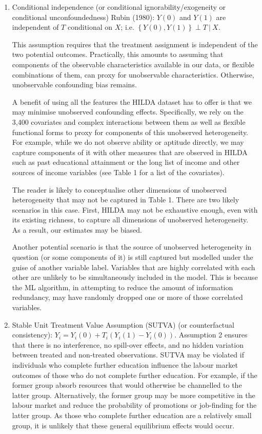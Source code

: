 \documentclass[12pt, a4paper]{article}
\begin{document}
\begin{enumerate}
  \item Conditional independence (or conditional ignorability/exogeneity or conditional unconfoundedness) Rubin (1980): $Y(0)$ and $Y(1)$ are independent of $T$ conditional on $X$; i.e. $\left\{Y(0), Y(1)\right\} \perp T~|~X$.  
  
This assumption requires that the treatment assignment is independent of the two potential outcomes. Practically, this amounts to assuming that components of the observable characteristics available in our data, or flexible combinations of them, can proxy for unobservable characteristics. Otherwise, unobservable confounding bias remains.

    A benefit of using all the features the HILDA dataset has to offer is that we may minimise unobserved confounding effects. Specifically, we rely on the 3,400 covariates and complex interactions between them as well as flexible functional forms to proxy for components of this unobserved heterogeneity. For example, while we do not observe ability or aptitude directly, we may capture components of it with other measures that are observed in HILDA such as past educational attainment or the long list of income and other sources of income variables (see Table 1 for a list of the covariates). 

The reader is likely to conceptualise other dimensions of unobserved heterogeneity that may not be captured in Table 1. There are two likely scenarios in this case. First, HILDA may not be exhaustive enough, even with its existing richness, to capture all dimensions of unobserved heterogeneity. As a result, our estimates may be biased. 

Another potential scenario is that the source of unobserved heterogeneity in question (or some components of it) is still captured but modelled under the guise of another variable label. Variables that are highly correlated with each other are unlikely to be simultaneously included in the model. This is because the ML algorithm, in attempting to reduce the amount of information redundancy, may have randomly dropped one or more of those correlated variables. 

  \item Stable Unit Treatment Value Assumption (SUTVA) (or counterfactual consistency): $Y_i = Y_i(0) +T_i(Y_i(1) - Y_i(0))$. Assumption 2 ensures that there is no interference, no spill-over effects, and no hidden variation between treated and non-treated observations. SUTVA may be violated if individuals who complete further education influence the labour market outcomes of those who do not complete further education. For example, if the former group absorb resources that would otherwise be channelled to the latter group. Alternatively, the former group may be more competitive in the labour market and reduce the probability of promotions or job-finding for the latter group. As those who complete further education are a relatively small group, it is unlikely that these general equilibrium effects would occur. 


\end{enumerate}
\end{document}
